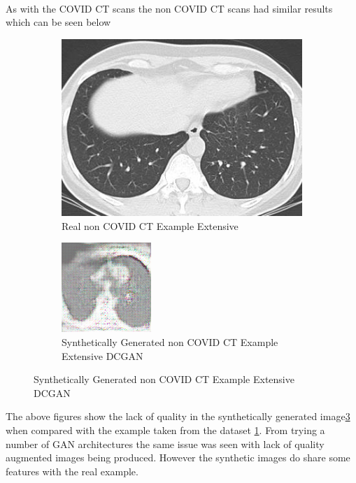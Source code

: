 \\
As with the COVID CT scans the non COVID CT scans had similar results which can be seen below
 \begin{figure}[H]
    \centering
    \begin{subfigure}{.4\textwidth}
    \centering
      \includegraphics[width=.4\linewidth,keepaspectratio]{Images/ExampleOfNonCOVIDCTScan.png}
      \caption{Real non COVID CT Example Extensive}
      \label{fig:Real non COVID CT Example Extensive}
    \end{subfigure}\hfill%
    \begin{subfigure}{.4\textwidth}
    \centering
      \includegraphics[width=.4\linewidth,keepaspectratio]{Images/ExampleOfSyntheticNonCOVIDCTScanExtensiveDCGAN.png}
      \caption{Synthetically Generated non COVID CT Example Extensive DCGAN}
      \label{fig:Synthetically Generated non COVID CT Example Extensive DCGAN}
    \end{subfigure}\hfill%
\end{figure}
The above figures show the lack of quality in the synthetically generated image\ref{fig:Synthetically Generated non COVID CT Example Extensive DCGAN} when compared with the example taken from the dataset \ref{fig:Real non COVID CT Example Extensive}. From trying a number of GAN architectures the same issue was seen with lack of quality augmented images being produced.  However the synthetic images do share some features with the real example.
